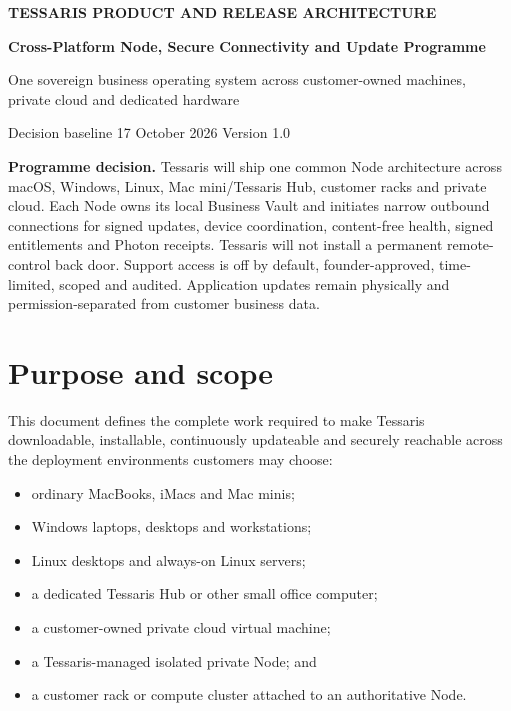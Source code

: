 \documentclass[11pt]{article}
\begin{document}
\begin{center}
  {\small\bfseries\color{TessarisBlue} TESSARIS PRODUCT AND RELEASE ARCHITECTURE}\par
  \vspace{8pt}
  {\LARGE\bfseries Cross-Platform Node, Secure Connectivity and Update Programme}\par
  \vspace{7pt}
  {\large One sovereign business operating system across customer-owned machines, private cloud and dedicated hardware}\par
  \vspace{12pt}
  {\color{TessarisGrey}Decision baseline \textbullet{} 17 October 2026 \textbullet{} Version 1.0}
\end{center}

\vspace{8pt}
\noindent\colorbox{TessarisPale}{\parbox{0.96\linewidth}{
\textbf{Programme decision.} Tessaris will ship one common Node architecture across macOS, Windows, Linux, Mac mini/Tessaris Hub, customer racks and private cloud. Each Node owns its local Business Vault and initiates narrow outbound connections for signed updates, device coordination, content-free health, signed entitlements and Photon receipts. Tessaris will not install a permanent remote-control back door. Support access is off by default, founder-approved, time-limited, scoped and audited. Application updates remain physically and permission-separated from customer business data.
}}

\tableofcontents
\newpage

\section{Purpose and scope}

This document defines the complete work required to make Tessaris downloadable, installable, continuously updateable and securely reachable across the deployment environments customers may choose:

\begin{itemize}
  \item ordinary MacBooks, iMacs and Mac minis;
  \item Windows laptops, desktops and workstations;
  \item Linux desktops and always-on Linux servers;
  \item a dedicated Tessaris Hub or other small office computer;
  \item a customer-owned private cloud virtual machine;
  \item a Tessaris-managed isolated private Node; and
  \item a customer rack or compute cluster attached to an authoritative Node.
\end{itemize}
\end{document}
